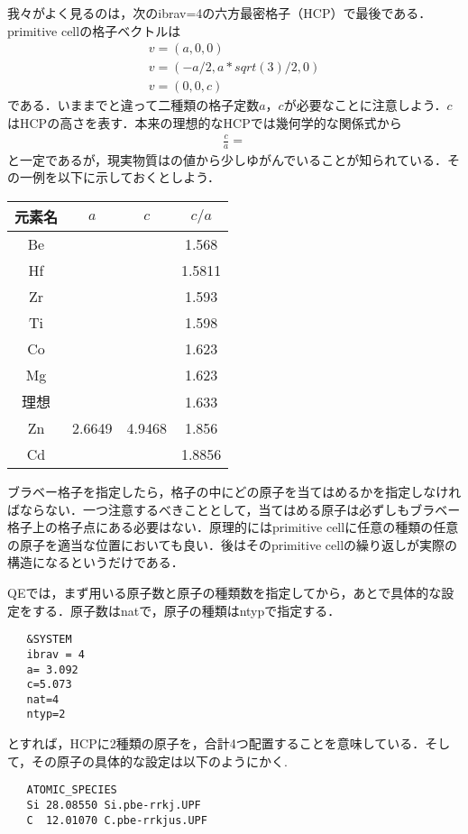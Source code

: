 \documentclass[a4j]{jarticle}
\begin{document}
  我々がよく見るのは，次のibrav=4の六方最密格子（HCP）で最後である．primitive cellの格子ベクトルは
  \begin{align*}
   v=(a,0,0) \\
   v=(-a/2,a*sqrt(3)/2,0) \\
   v=(0,0,c)
  \end{align*}
  である．いままでと違って二種類の格子定数$a$，$c$が必要なことに注意しよう．$c$はHCPの高さを表す．本来の理想的なHCPでは幾何学的な関係式から
  \begin{align*}
   \frac{c}{a}=
  \end{align*}
  と一定であるが，現実物質はの値から少しゆがんでいることが知られている．その一例を以下に示しておくとしよう．
   \begin{table}[htb]
    \centering
   \begin{tabular}{|c|c|c|c|}
    元素名&$a$ &$c$ &$c/a$ \\ \hline
    Be& & &1.568 \\\hline
    Hf& & &1.5811 \\\hline
    Zr& & &1.593 \\\hline
    Ti& & &1.598 \\\hline
    Co& & &1.623 \\\hline
    Mg& & &1.623 \\\hline
    理想& & &1.633 \\\hline
    Zn&2.6649 &4.9468 &1.856 \\\hline
    Cd& & &1.8856 \\\hline
   \end{tabular}
   \end{table}


  ブラベー格子を指定したら，格子の中にどの原子を当てはめるかを指定しなければならない．一つ注意するべきこととして，当てはめる原子は必ずしもブラベー格子上の格子点にある必要はない．原理的にはprimitive cellに任意の種類の任意の原子を適当な位置においても良い．後はそのprimitive cellの繰り返しが実際の構造になるというだけである．

  QEでは，まず用いる原子数と原子の種類数を指定してから，あとで具体的な設定をする．原子数はnatで，原子の種類はntypで指定する．
  \begin{lstlisting}
   &SYSTEM
   ibrav = 4
   a= 3.092
   c=5.073
   nat=4
   ntyp=2
  \end{lstlisting}
  とすれば，HCPに2種類の原子を，合計4つ配置することを意味している．そして，その原子の具体的な設定は以下のようにかく.


  \begin{lstlisting}
   ATOMIC_SPECIES
   Si 28.08550 Si.pbe-rrkj.UPF
   C  12.01070 C.pbe-rrkjus.UPF
  \end{lstlisting}
\end{document}

